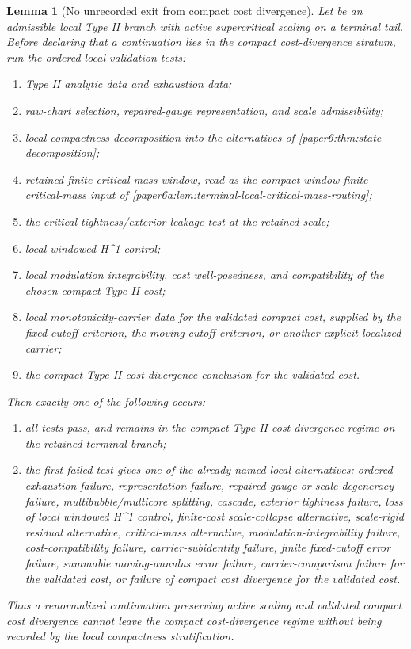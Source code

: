 \documentclass[11pt]{amsart}
\def\({}%
\def\){}%
\theoremstyle{plain}
\newtheorem{lemma}[lemma]{Lemma}
\theoremstyle{definition}
\theoremstyle{remark}
\begin{document}
\begin{lemma}[No unrecorded exit from compact cost divergence]
\label{paper7:lem:no-unrecorded-cost-escape}
Let \(\omega\) be an admissible local Type II branch with active supercritical
scaling on a terminal tail.  Before declaring that a continuation lies in the
compact cost-divergence stratum, run the ordered local validation tests:
\begin{enumerate}[label=\textup{(\roman*)}]
\item Type II analytic data and exhaustion data;
\item raw-chart selection, repaired-gauge representation, and scale
admissibility;
\item local compactness decomposition into the alternatives of
\cref{paper6:thm:state-decomposition};
\item retained finite critical-mass window, read as the compact-window
finite critical-mass input of
\cref{paper6a:lem:terminal-local-critical-mass-routing};
\item the critical-tightness/exterior-leakage test at the retained scale;
\item local windowed \(H^1\) control;
\item local modulation integrability, cost well-posedness, and compatibility of
the chosen compact Type II cost;
\item local monotonicity-carrier data for the validated compact cost, supplied
by the fixed-cutoff criterion, the moving-cutoff criterion, or another explicit
localized carrier;
\item the compact Type II cost-divergence conclusion for the validated cost.
\end{enumerate}
Then exactly one of the following occurs:
\begin{enumerate}[label=\textup{(\alph*)}]
\item all tests pass, and \(\omega\) remains in the compact Type II
cost-divergence regime on the retained terminal branch;
\item the first failed test gives one of the already named local alternatives:
ordered exhaustion failure, representation failure, repaired-gauge or
scale-degeneracy failure, multibubble/multicore splitting, cascade, exterior
tightness failure, loss of local windowed \(H^1\) control, finite-cost
scale-collapse alternative, scale-rigid residual alternative, critical-mass
alternative, modulation-integrability failure, cost-compatibility failure,
carrier-subidentity failure, finite fixed-cutoff error failure, summable
moving-annulus error failure, carrier-comparison failure for the validated
cost, or failure of compact cost divergence for the validated cost.
\end{enumerate}
Thus a renormalized continuation preserving active scaling and validated compact
cost divergence cannot leave the compact cost-divergence regime without being
recorded by the local compactness stratification.
\end{lemma}
\end{document}
